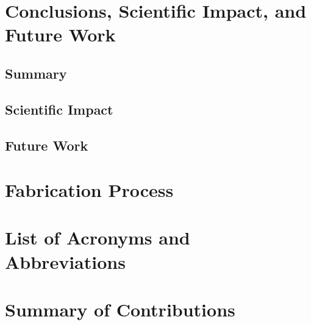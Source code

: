 \documentclass[12pt,onecolumn]{report}
\begin{document}
\chapter{Conclusions, Scientific Impact, and Future Work}
    \section{Summary}
    \section{Scientific Impact}
    \section{Future Work}

\clearpage
{}
\nocite{*}
\printbibliography
%
%

\begin{appendices}

\chapter{Fabrication Process} \label{Fabrication}
% 

\chapter{List of Acronyms and Abbreviations}
% 

\chapter{Summary of Contributions}
% 

\chapter{}

\end{appendices}
\end{document}
